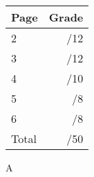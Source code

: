 \documentclass[12pt]{article}
\newcommand{\skipline}{\vspace{12pt}}
\begin{document}
\begin{table}[hbt]
\begin{center}
\begin{tabular}{|l|r|} \hline
Page&Grade\\
\hline \hline
\cline{1-2} 2 & \enspace\enspace\enspace\enspace\enspace\enspace/12\\
\cline{1-2} 3 & \enspace\enspace\enspace\enspace\enspace\enspace/12\\
\cline{1-2} 4 & \enspace\enspace\enspace\enspace\enspace\enspace/10\\
\cline{1-2} 5 & \enspace\enspace\enspace\enspace\enspace\enspace/8\\
\cline{1-2} 6 & \enspace\enspace\enspace\enspace\enspace\enspace/8\\
\cline{1-2} Total & \enspace\enspace\enspace\enspace\enspace\enspace/50\\
\hline
\end{tabular}

\skipline

\skipline



A
\end{center}
\end{table}
\newpage
\end{document}
